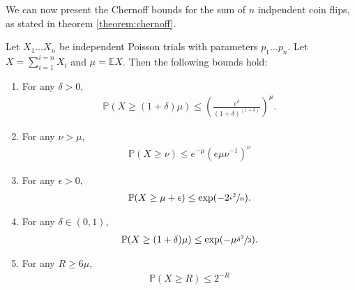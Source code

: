 	We can now present the Chernoff bounds for the sum of $n$ indpendent coin flips, as stated
	in theorem \ref{theorem:chernoff}.
	\begin{theorem}
		\label{theorem:chernoff}
		Let $X_1\hdots X_n$ be independent Poisson trials with parameters $p_1\hdots p_n$.
		Let $X = \sum_{i=1}^{i=n} X_i$ and $\mu = \mathbb{E}X$. Then the following bounds 
		hold:
		\begin{enumerate}
			\item For any $\delta > 0$, 
			\begin{align}
				\mathbb{P}(X \geq (1+\delta)\mu) \leq 
				\left(\frac{e^\delta}{(1+\delta)^{(1+\delta)}}\right)^\mu.
				\label{chernoff1}
			\end{align}
			\item For any $\nu > \mu$, 
			\begin{align}
				\mathbb{P}(X \geq \nu) \leq e^{-\mu} \left(e\mu\nu^{-1}\right)^\nu
				\label{altchernoff1}
			\end{align}
			\item For any $\epsilon > 0$,
			\begin{align}
				\mathbb{P}(X\geq \mu+\epsilon)\leq\exp(-2\sfrac{\epsilon^2}{n}).
				\label{altchernoff2}
			\end{align}
			\item For any $\delta \in (0,1)$,
			\begin{align}
				\mathbb{P}(X\geq (1+\delta)\mu) \leq \exp(-\mu\sfrac{\delta^2}{3}).
				\label{chernoff2}
			\end{align}
			\item For any $R \geq 6\mu$,
			\begin{align}
				\label{chernoff3}
				\mathbb{P}(X\geq R) \leq 2^{-R}
			\end{align}
		\end{enumerate}
	\end{theorem}
	
